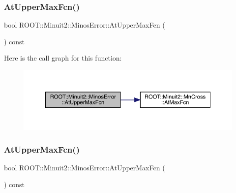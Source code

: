 \subsubsection{\texorpdfstring{AtUpperMaxFcn()}{AtUpperMaxFcn()}\hspace{0.1cm}{\footnotesize\ttfamily [1/3]}}
{\footnotesize\ttfamily bool R\+O\+O\+T\+::\+Minuit2\+::\+Minos\+Error\+::\+At\+Upper\+Max\+Fcn (\begin{DoxyParamCaption}{ }\end{DoxyParamCaption}) const\hspace{0.3cm}{\ttfamily [inline]}}

Here is the call graph for this function\+:
\nopagebreak
\begin{figure}[H]
\begin{center}
\leavevmode
\includegraphics[width=350pt]{d2/dd1/classROOT_1_1Minuit2_1_1MinosError_a940c974f6ac87d22c4d340ef2fc88e8c_cgraph}
\end{center}
\end{figure}
\mbox{\label{classROOT_1_1Minuit2_1_1MinosError_a940c974f6ac87d22c4d340ef2fc88e8c}} 
\subsubsection{\texorpdfstring{AtUpperMaxFcn()}{AtUpperMaxFcn()}\hspace{0.1cm}{\footnotesize\ttfamily [2/3]}}
{\footnotesize\ttfamily bool R\+O\+O\+T\+::\+Minuit2\+::\+Minos\+Error\+::\+At\+Upper\+Max\+Fcn (\begin{DoxyParamCaption}{ }\end{DoxyParamCaption}) const\hspace{0.3cm}{\ttfamily [inline]}}

